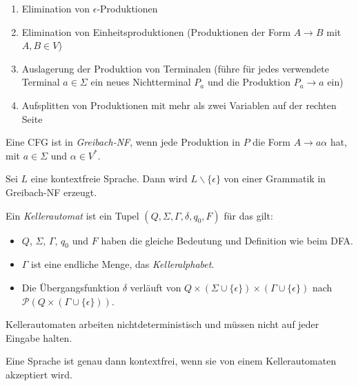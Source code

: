 \documentclass{cheat-sheet}
\begin{document}
\begin{enumerate}
  \item Elimination von $\epsilon$-Produktionen
  \item Elimination von Einheitsproduktionen (Produktionen der Form $A \longrightarrow B$ mit $A, B \in V$)
  \item Auslagerung der Produktion von Terminalen (führe für jedes verwendete Terminal $a \in \Sigma$ ein neues Nichtterminal $P_{a}$ und die Produktion $P_{a} \longrightarrow a$ ein)
  \item Aufsplitten von Produktionen mit mehr als zwei Variablen auf der rechten Seite
\end{enumerate}


\begin{defn}
Eine CFG ist in \emph{Greibach-NF}, wenn jede Produktion in $P$ die Form $A \longrightarrow a \alpha$ hat, mit $a \in \Sigma$ und $\alpha \in V^{*}$.
\end{defn}

\begin{satz}
Sei $L$ eine kontextfreie Sprache. Dann wird $L \backslash \{ \epsilon \}$ von einer Grammatik in Greibach-NF erzeugt.
\end{satz}

\begin{defn}
Ein \emph{Kellerautomat} ist ein Tupel $(Q, \Sigma, \Gamma, \delta, q_{0}, F)$ für das gilt:

\begin{itemize}
  \item $Q$, $\Sigma$, $\Gamma$, $q_{0}$ und $F$ haben die gleiche Bedeutung und Definition wie beim DFA.
  \item $\Gamma$ ist eine endliche Menge, das \emph{Kelleralphabet}.
  \item Die Übergangsfunktion $\delta$ verläuft von $Q \times (\Sigma \cup \{ \epsilon \}) \times (\Gamma \cup \{ \epsilon \})$ nach $\mathcal{P}(Q \times (\Gamma \cup \{ \epsilon \}))$.
\end{itemize}
\end{defn}

\begin{bem}
Kellerautomaten arbeiten nichtdeterministisch und müssen nicht auf jeder Eingabe halten.
\end{bem}


\begin{satz}
Eine Sprache ist genau dann kontextfrei, wenn sie von einem Kellerautomaten akzeptiert wird.
\end{satz}
\end{document}
